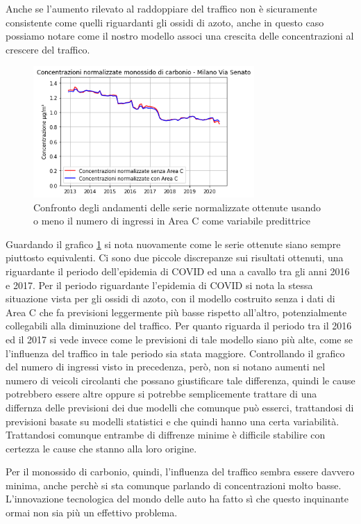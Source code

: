 \documentclass[a4paper]{report}
\begin{document}
Anche se l'aumento rilevato al raddoppiare del traffico non è sicuramente consistente come quelli riguardanti gli ossidi di azoto, anche in questo caso possiamo notare come il nostro modello associ una crescita delle concentrazioni al crescere del traffico. 

\begin{figure}[h]
\centering
\includegraphics[width=0.75\textwidth]{co_areac}
\caption{Confronto degli andamenti delle serie normalizzate ottenute usando o meno il numero di ingressi in Area C come variabile predittrice}
\label{fig:co_areac}
\end{figure}

Guardando il grafico \ref{fig:co_areac} si nota nuovamente come le serie ottenute siano sempre piuttosto equivalenti. Ci sono due piccole discrepanze sui risultati ottenuti, una riguardante il periodo dell'epidemia di COVID ed una a cavallo tra gli anni 2016 e 2017.
Per il periodo riguardante l'epidemia di COVID si nota la stessa situazione vista per gli ossidi di azoto, con il modello costruito senza i dati di Area C che fa previsioni leggermente più basse rispetto all'altro, potenzialmente collegabili alla diminuzione del traffico. Per quanto riguarda il periodo tra il 2016 ed il 2017 si vede invece come le previsioni di tale modello siano più alte, come se l'influenza del traffico in tale periodo sia stata maggiore. Controllando il grafico del numero di ingressi visto in precedenza, però, non si notano aumenti nel numero di veicoli circolanti che possano giustificare tale differenza, quindi le cause potrebbero essere altre oppure si potrebbe semplicemente trattare di una differnza delle previsioni dei due modelli che comunque può esserci, trattandosi di previsioni basate su modelli statistici e che quindi hanno una certa variabilità.
Trattandosi comunque entrambe di diffrenze minime è difficile stabilire con certezza le cause che stanno alla loro origine.

Per il monossido di carbonio, quindi, l'influenza del traffico sembra essere davvero minima, anche perchè si sta comunque parlando di concentrazioni molto basse. L'innovazione tecnologica del mondo delle auto ha fatto sì che questo inquinante ormai non sia più un effettivo problema.
\end{document}
